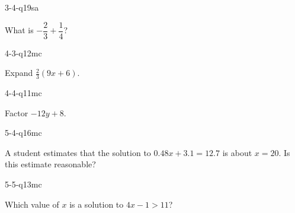 \begin{practiceQuestion}{3-4-q19}{sa}
\begin{questionText}
What is $-\dfrac{2}{3} + \dfrac{1}{4}$?
\end{questionText}
\end{practiceQuestion}

\begin{practiceQuestion}{4-3-q12}{mc}
\begin{questionText}
Expand $\frac{2}{3}(9x + 6)$.


\end{questionText}
\end{practiceQuestion}

\begin{practiceQuestion}{4-4-q11}{mc}
\begin{questionText}
Factor $-12y + 8$.
\end{questionText}
\end{practiceQuestion}

\begin{practiceQuestion}{5-4-q16}{mc}
\begin{questionText}
A student estimates that the solution to $0.48x + 3.1 = 12.7$ is about $x = 20$. Is this estimate reasonable?
\end{questionText}
\end{practiceQuestion}

\begin{practiceQuestion}{5-5-q13}{mc}
\begin{questionText}
Which value of $x$ is a solution to $4x - 1 > 11$?
\end{questionText}
\end{practiceQuestion}

